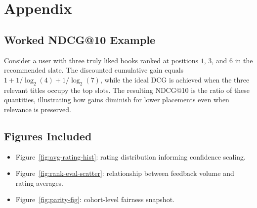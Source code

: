 \section{Appendix}
\subsection*{Worked NDCG@10 Example}
Consider a user with three truly liked books ranked at positions $1$, $3$, and $6$ in the recommended slate. The discounted cumulative gain equals $1 + 1/\log_2(4) + 1/\log_2(7)$, while the ideal DCG is achieved when the three relevant titles occupy the top slots. The resulting NDCG@10 is the ratio of these quantities, illustrating how gains diminish for lower placements even when relevance is preserved.

\subsection*{Figures Included}
\begin{itemize}[leftmargin=*]
    \item Figure~\ref{fig:avg-rating-hist}: rating distribution informing confidence scaling.
    \item Figure~\ref{fig:rank-eval-scatter}: relationship between feedback volume and rating averages.
    \item Figure~\ref{fig:parity-fig}: cohort-level fairness snapshot.
\end{itemize}
